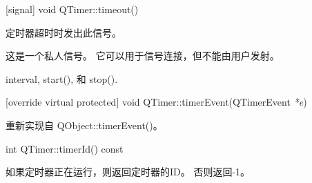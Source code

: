 [signal] void QTimer::timeout()

定时器超时时发出此信号。

\begin{notice}
这是一个私人信号。 它可以用于信号连接，但不能由用户发射。
\end{notice}

\begin{notice}[另请参阅]
interval, start(), 和 stop().
\end{notice}

[override virtual protected] void QTimer::timerEvent(QTimerEvent \emph{*e})

重新实现自 QObject::timerEvent()。

int QTimer::timerId() const

如果定时器正在运行，则返回定时器的ID。 否则返回-1。




